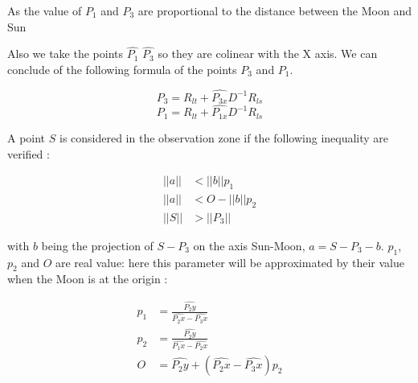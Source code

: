 \documentclass[11pt]{article} %
\begin{document}
		As the value of $P_1$ and $P_3$ are proportional to the distance between the Moon and Sun 
		
		Also we take the points $\hat{P_1}$ $\hat{P_3}$ so they are colinear with the X axis. We can conclude of the following formula of the points $P_3$ and $P_1$.
		
		
		$$
		\begin{equation}
			P_3=R_{lt}+\hat{P_{3x}}D^{-1}R_{ls} 
		\end{equation}
		$$
		$$
		\begin{equation}
			P_1=R_{lt}+\hat{P_{1x}}D^{-1}R_{ls} 
		\end{equation}
		$$
		
		A point $S$ is considered in the observation zone if the following inequality are verified : 
		
		$$
		\begin{equation}
			\begin{align}
				||a||&<||b||p_1\\
				||a||&<O-||b||p_2\\
				||S||&>||P_3||
			\end{align}	
		\end{equation}
		$$
		
		
		with $b$ being the projection of $S-P_3$ on the axis Sun-Moon, $a=S-P_3-b$. $p_1$, $p_2$ and $O$ are real value: here this parameter will be approximated by their value when the Moon is at the origin :
		
		
		$$
		\begin{align}
			p_1&=\frac{\hat{P_2y}}{\hat{P_2x}-\hat{P_3x}}\\
			p_2&=\frac{\hat{P_2y}}{\hat{P_1x}-\hat{P_2x}}\\
			O&=\hat{P_2y}+(\hat{P_2x}-\hat{P_3x})p_2
		\end{align}	
		$$ 
		
\end{document}
